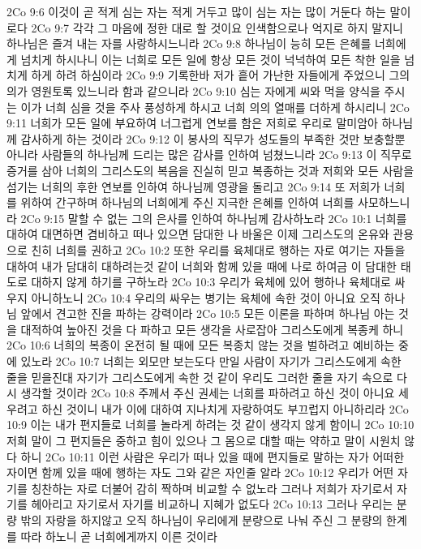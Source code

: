 2Co 9:6  이것이 곧 적게 심는 자는 적게 거두고 많이 심는 자는 많이 거둔다 하는 말이로다
2Co 9:7  각각 그 마음에 정한 대로 할 것이요 인색함으로나 억지로 하지 말지니 하나님은 즐겨 내는 자를 사랑하시느니라
2Co 9:8  하나님이 능히 모든 은혜를 너희에게 넘치게 하시나니 이는 너희로 모든 일에 항상 모든 것이 넉넉하여 모든 착한 일을 넘치게 하게 하려 하심이라
2Co 9:9  기록한바 저가 흩어 가난한 자들에게 주었으니 그의 의가 영원토록 있느니라 함과 같으니라
2Co 9:10  심는 자에게 씨와 먹을 양식을 주시는 이가 너희 심을 것을 주사 풍성하게 하시고 너희 의의 열매를 더하게 하시리니
2Co 9:11  너희가 모든 일에 부요하여 너그럽게 연보를 함은 저희로 우리로 말미암아 하나님께 감사하게 하는 것이라
2Co 9:12  이 봉사의 직무가 성도들의 부족한 것만 보충할뿐 아니라 사람들의 하나님께 드리는 많은 감사를 인하여 넘쳤느니라
2Co 9:13  이 직무로 증거를 삼아 너희의 그리스도의 복음을 진실히 믿고 복종하는 것과 저희와 모든 사람을 섬기는 너희의 후한 연보를 인하여 하나님께 영광을 돌리고
2Co 9:14  또 저희가 너희를 위하여 간구하며 하나님의 너희에게 주신 지극한 은혜를 인하여 너희를 사모하느니라
2Co 9:15  말할 수 없는 그의 은사를 인하여 하나님께 감사하노라
2Co 10:1  너희를 대하여 대면하면 겸비하고 떠나 있으면 담대한 나 바울은 이제 그리스도의 온유와 관용으로 친히 너희를 권하고
2Co 10:2  또한 우리를 육체대로 행하는 자로 여기는 자들을 대하여 내가 담대히 대하려는것 같이 너희와 함께 있을 때에 나로 하여금 이 담대한 태도로 대하지 않게 하기를 구하노라
2Co 10:3  우리가 육체에 있어 행하나 육체대로 싸우지 아니하노니
2Co 10:4  우리의 싸우는 병기는 육체에 속한 것이 아니요 오직 하나님 앞에서 견고한 진을 파하는 강력이라
2Co 10:5  모든 이론을 파하며 하나님 아는 것을 대적하여 높아진 것을 다 파하고 모든 생각을 사로잡아 그리스도에게 복종케 하니
2Co 10:6  너희의 복종이 온전히 될 때에 모든 복종치 않는 것을 벌하려고 예비하는 중에 있노라
2Co 10:7  너희는 외모만 보는도다 만일 사람이 자기가 그리스도에게 속한 줄을 믿을진대 자기가 그리스도에게 속한 것 같이 우리도 그러한 줄을 자기 속으로 다시 생각할 것이라
2Co 10:8  주께서 주신 권세는 너희를 파하려고 하신 것이 아니요 세우려고 하신 것이니 내가 이에 대하여 지나치게 자랑하여도 부끄럽지 아니하리라
2Co 10:9  이는 내가 편지들로 너희를 놀라게 하려는 것 같이 생각지 않게 함이니
2Co 10:10  저희 말이 그 편지들은 중하고 힘이 있으나 그 몸으로 대할 때는 약하고 말이 시원치 않다 하니
2Co 10:11  이런 사람은 우리가 떠나 있을 때에 편지들로 말하는 자가 어떠한 자이면 함께 있을 때에 행하는 자도 그와 같은 자인줄 알라
2Co 10:12  우리가 어떤 자기를 칭찬하는 자로 더불어 감히 짝하며 비교할 수 없노라 그러나 저희가 자기로서 자기를 헤아리고 자기로서 자기를 비교하니 지혜가 없도다
2Co 10:13  그러나 우리는 분량 밖의 자랑을 하지않고 오직 하나님이 우리에게 분량으로 나눠 주신 그 분량의 한계를 따라 하노니 곧 너희에게까지 이른 것이라
